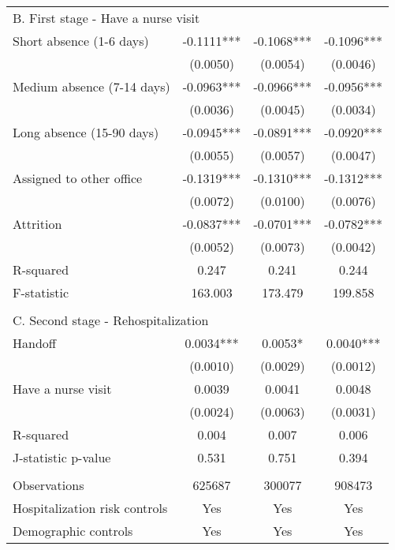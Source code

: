 \documentclass[final,12pt, notitlepage]{article}
\begin{document}
\begin{singlespace}
\begin{table}[H]
\begin{threeparttable}
{\begin{tabular*}{\textwidth}{l@{\extracolsep{\fill}}*{3}{c}}
\multicolumn{4}{l}{B. First stage - Have a nurse visit} \\
Short absence (1-6 days) &     -0.1111*** &     -0.1068*** &     -0.1096***\\
                  &    (0.0050)      &    (0.0054)      &    (0.0046)   \\
Medium absence (7-14 days)&     -0.0963*** &     -0.0966*** &     -0.0956***\\
                  &    (0.0036)     &    (0.0045)     &    (0.0034)   \\
Long absence (15-90 days)&     -0.0945*** &     -0.0891*** &     -0.0920***\\
                 &    (0.0055)      &    (0.0057)      &    (0.0047)   \\
Assigned to other office&     -0.1319*** &     -0.1310*** &     -0.1312***\\
                &    (0.0072)      &    (0.0100)      &    (0.0076)   \\
Attrition        &     -0.0837***  &     -0.0701*** &     -0.0782***\\
                    &    (0.0052)    &    (0.0073)     &    (0.0042)   \\
R-squared           &       0.247   &       0.241    &       0.244   \\
F-statistic       &     163.003        &     173.479     &     199.858   \\
\\
\multicolumn{4}{l}{C. Second stage - Rehospitalization} \\
Handoff         &      0.0034***     &      0.0053*   &      0.0040***\\
                   &    (0.0010)     &    (0.0029)    &    (0.0012)   \\
Have a nurse visit   &      0.0039   &      0.0041    &      0.0048   \\
                    &    (0.0024)     &    (0.0063)    &    (0.0031)   \\
R-squared          &       0.004      &       0.007    &       0.006   \\
J-statistic p-value    &       0.531   &       0.751   &       0.394   \\
\\
\midrule
Observations       &      625687   &      300077      &      908473   \\
Hospitalization risk controls & Yes & Yes & Yes \\
Demographic controls & Yes & Yes & Yes \\

\end{tabular*}}
\end{threeparttable}
\end{table}
\end{singlespace}
\end{document}
